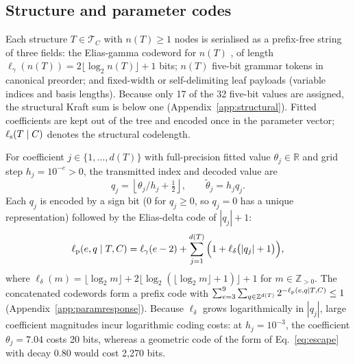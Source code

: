 \subsection{Structure and parameter codes}\label{sec:codes}

Each structure \(T\in\mathcal T_C\) with \(n(T)\ge1\) nodes is serialised as a prefix-free string of three fields: the Elias-gamma codeword for \(n(T)\) \citep{elias1975codes}, of length \(\ell_\gamma(n(T))=2\lfloor\log_2 n(T)\rfloor+1\) bits; \(n(T)\) five-bit grammar tokens in canonical preorder; and fixed-width or self-delimiting leaf payloads (variable indices and basis lengths). Because only 17 of the 32 five-bit values are assigned, the structural Kraft sum is below one (Appendix~\ref{app:structural}). Fitted coefficients are kept out of the tree and encoded once in the parameter vector; \(\ell_{\rm s}(T\mid C)\) denotes the structural codelength.

For coefficient \(j\in\{1,\ldots,d(T)\}\) with full-precision fitted value \(\theta_j\in\mathbb R\) and grid step \(h_j=10^{-e}>0\), the transmitted index and decoded value are
\begin{equation}\label{eq:grid}
q_j=\left\lfloor \theta_j/h_j+\tfrac12\right\rfloor,
\qquad \widetilde\theta_j=h_jq_j.
\end{equation}
Each \(q_j\) is encoded by a sign bit (\(0\) for \(q_j\ge0\), so \(q_j=0\) has a unique representation) followed by the Elias-delta code \citep{elias1975codes} of \(|q_j|+1\):
\begin{equation}\label{eq:paramprior}
\ell_{\rm p}(e,q\mid T,C)=\ell_\gamma(e-2)+\sum_{j=1}^{d(T)}\Big(1+\ell_\delta\big(|q_j|+1\big)\Big),
\end{equation}
where \(\ell_\delta(m)=\lfloor\log_2 m\rfloor+2\lfloor\log_2(\lfloor\log_2 m\rfloor+1)\rfloor+1\) for \(m\in\mathbb Z_{>0}\). The concatenated codewords form a prefix code with \(\sum_{e=3}^{9}\sum_{q\in\mathbb Z^{d(T)}} 2^{-\ell_{\rm p}(e,q\mid T,C)}\le1\) (Appendix~\ref{app:paramresponse}). Because \(\ell_\delta\) grows logarithmically in \(|q_j|\), large coefficient magnitudes incur logarithmic coding costs: at \(h_j=10^{-3}\), the coefficient \(\theta_j=7.04\) costs 20 bits, whereas a geometric code of the form of Eq.~\eqref{eq:escape} with decay 0.80 would cost 2{,}270 bits.

